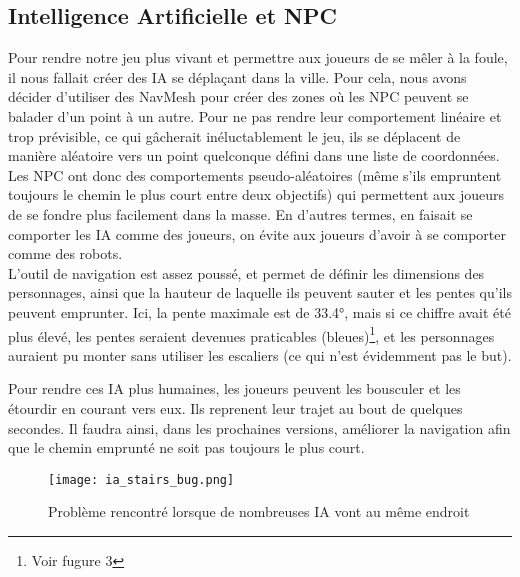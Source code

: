 \subsection{Intelligence Artificielle et NPC}

Pour rendre notre jeu plus vivant et permettre aux joueurs de se mêler à la foule,
il nous fallait créer des IA se déplaçant dans la ville.
Pour cela, nous avons décider d'utiliser des NavMesh pour créer des zones où les 
NPC peuvent se balader d'un point à un autre.
Pour ne pas rendre leur comportement linéaire et trop prévisible, ce qui gâcherait inéluctablement le jeu,
ils se déplacent de manière aléatoire  vers un point quelconque défini dans une liste de coordonnées.
Les NPC ont donc des comportements pseudo-aléatoires (même s'ils empruntent toujours le chemin le plus court entre deux objectifs) qui permettent
aux joueurs de se fondre plus facilement dans la masse. En d'autres termes, en faisait se comporter les IA comme des joueurs, on évite aux joueurs
d'avoir à se comporter comme des robots.\\

L’outil de navigation est assez poussé, et permet de définir les dimensions des personnages,
ainsi que la hauteur de laquelle ils peuvent sauter et les pentes qu’ils peuvent emprunter.
Ici, la pente maximale est de 33.4°, mais si ce chiffre avait été plus élevé,
les pentes seraient devenues praticables (bleues)\footnote{Voir fugure 3}, et les personnages auraient pu
monter sans utiliser les escaliers (ce qui n’est évidemment pas le but).


Pour rendre ces IA plus humaines, les joueurs peuvent les bousculer et les étourdir en courant vers eux.
Ils reprenent leur trajet au bout de quelques secondes. Il faudra ainsi, dans les prochaines versions, 
améliorer la navigation afin que le chemin emprunté ne soit pas toujours le plus court. 
\newline

\begin{figure}[h!]
        \centering
        \texttt{[image: ia\_stairs\_bug.png]}
        \caption{Problème rencontré lorsque de nombreuses IA vont au même endroit}
\end{figure}